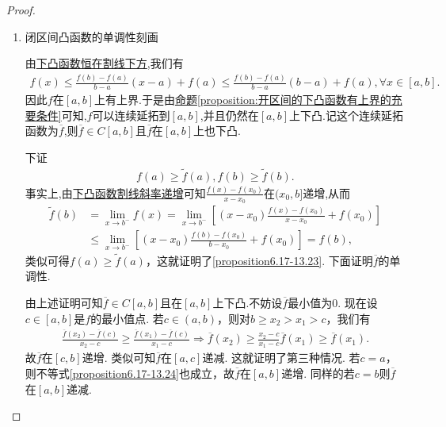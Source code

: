 \documentclass[../../main.tex]{subfiles}
\begin{document}
\begin{proof}
\begin{enumerate}
\item {\heiti 闭区间凸函数的单调性刻画}

由\hyperref[下凸函数恒在割线下方]{下凸函数恒在割线下方},我们有
\begin{align*}
f\left( x \right) \leqslant \frac{f\left( b \right) -f\left( a \right)}{b-a}\left( x-a \right) +f\left( a \right) \leqslant \frac{f\left( b \right) -f\left( a \right)}{b-a}\left( b-a \right) +f\left( a \right) ,\forall x\in \left[ a,b \right] .
\end{align*}
因此$f$在$[a,b]$上有上界.于是由\hyperref[proposition:开区间的下凸函数有上界的充要条件]{命题\ref{proposition:开区间的下凸函数有上界的充要条件}}可知,$f$可以连续延拓到$[a,b]$,并且仍然在$[a,b]$上下凸.记这个连续延拓函数为$\overline{f}$,则$\overline{f} \in C[a,b]$且$\overline{f}$在$[a,b]$上也下凸.

下证
\begin{align}
f(a)\geqslant\tilde{f}(a),f(b)\geqslant\tilde{f}(b).\label{proposition6.17-13.23}
\end{align}
事实上,由\hyperref[下凸函数割线斜率递增]{下凸函数割线斜率递增}可知\(\frac{f(x)-f(x_0)}{x - x_0}\)在\((x_0,b]\)递增,从而
\begin{align*}
\tilde{f}(b)&=\lim_{x\rightarrow b^-}f(x)
=\lim_{x\rightarrow b^-}\left[(x - x_0)\frac{f(x)-f(x_0)}{x - x_0}+f(x_0)\right]\\
&\leqslant\lim_{x\rightarrow b^-}\left[(x - x_0)\frac{f(b)-f(x_0)}{b - x_0}+f(x_0)\right]
=f(b),
\end{align*}
类似可得\(f(a)\geqslant\tilde{f}(a)\)，这就证明了\eqref{proposition6.17-13.23}.
下面证明$\overline{f}$的单调性.

由上述证明可知\(\overline{f}\in C[a,b]\)且在$[a,b]$上下凸.不妨设\(\overline{f}\)最小值为\(0\). 现在设\(c\in[a,b]\)是\(f\)的最小值点. 若\(c\in(a,b)\)，则对\(b\geqslant x_2>x_1>c\)，我们有
\begin{align}
\frac{\overline{f}(x_2)-\overline{f}(c)}{x_2 - c}\geqslant\frac{\overline{f}(x_1)-\overline{f}(c)}{x_1 - c}\Rightarrow \overline{f}(x_2)\geqslant\frac{x_2 - c}{x_1 - c}\overline{f}(x_1)\geqslant \overline{f}(x_1).\label{proposition6.17-13.24} 
\end{align}
故\(\overline{f}\)在\([c,b]\)递增. 类似可知\(\overline{f}\)在\([a,c]\)递减. 这就证明了第三种情况. 若\(c = a\)，则不等式\eqref{proposition6.17-13.24}也成立，故\(\overline{f}\)在\([a,b]\)递增. 同样的若\(c = b\)则\(\overline{f}\)在\([a,b]\)递减.


\end{enumerate}
\end{proof}
\end{document}
